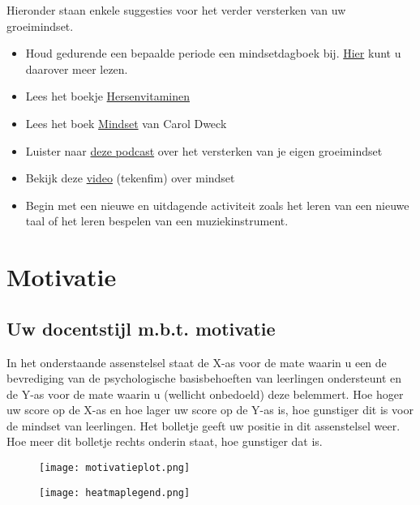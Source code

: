 \documentclass{article}
\begin{document}


Hieronder staan enkele suggesties voor het verder versterken van uw groeimindset.
\begin{itemize}
\item Houd gedurende een bepaalde periode een mindsetdagboek bij. \href{https://progressiegerichtwerken.nl/mindsetdagboek/}{Hier} kunt u daarover meer lezen.
\item Lees het boekje \href{https://www.managementboek.nl/boek/9789462960299/hersenvitaminen-gwenda-schlundt-bodien}{Hersenvitaminen}
\item Lees het boek \href{https://www.managementboek.nl/boek/9789088508097/mindset-carol-dweck}{Mindset} van Carol Dweck
\item Luister naar \href{https://progressiegerichtwerken.com/podcast-je-eigen-groeimindset-ontwikkelen}{deze podcast} over het versterken van je eigen groeimindset
\item Bekijk deze \href{https://progressiegerichtwerken.nl/carol-dweck-de-groeimindset-filmpje}{video} (tekenfim) over mindset
\item Begin met een nieuwe en uitdagende activiteit zoals het leren van een nieuwe taal of het leren bespelen van een muziekinstrument.
\end{itemize}\newpage



\section{Motivatie}
\subsection{Uw docentstijl m.b.t. motivatie}
In het onderstaande assenstelsel staat de X-as voor de mate waarin u een de bevrediging van de psychologische basisbehoeften van leerlingen ondersteunt en de Y-as voor de mate waarin u (wellicht onbedoeld) deze belemmert. Hoe hoger uw score op de X-as en hoe lager uw score op de Y-as is, hoe gunstiger dit is voor de mindset van leerlingen. Het bolletje geeft uw positie in dit assenstelsel weer. Hoe meer dit bolletje rechts onderin staat, hoe gunstiger dat is.

\begin{figure}[!h]
    \centering
    \begin{minipage}{0.9\textwidth}
        \centering
        \texttt{[image: motivatieplot.png]}
    \end{minipage}%
    \begin{minipage}{0.3\textwidth}
        \flushleft
        \texttt{[image: heatmaplegend.png]}
    \end{minipage}
\end{figure}
\end{document}
